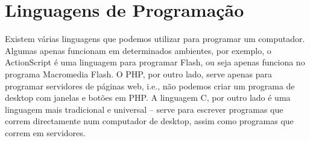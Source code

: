 %
%
%
%






\section{Linguagens de Programação}
Existem várias linguagens que podemos utilizar para programar um computador. Algumas apenas funcionam em determinados ambientes, por exemplo, o ActionScript é uma linguagem para programar Flash, ou seja apenas funciona no programa Macromedia Flash.
O PHP, por outro lado, serve apenas para programar servidores de páginas web, i.e., não podemos criar um programa de desktop com janelas e botões em PHP.
A linguagem C, por outro lado é uma linguagem mais tradicional e universal -- serve para escrever programas que correm directamente num computador de desktop, assim como programas que correm em servidores.

